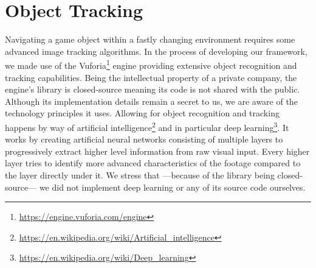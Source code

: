 \section{Object Tracking}
Navigating a game object within a fastly changing environment requires some advanced image tracking algorithms. In the process of developing our framework, we made use of the Vuforia\footnote{\protect\url{https://engine.vuforia.com/engine}} engine providing extensive object recognition and tracking capabilities. 
Being the intellectual property of a private company, the engine's library is closed-source meaning its code is not shared with the public. Although its implementation details remain a secret to us, we are aware of the technology principles it uses. Allowing for object recognition and tracking happens by way of artificial intelligence\footnote{\protect\url{https://en.wikipedia.org/wiki/Artificial_intelligence}} and in particular deep learning\footnote{\protect\url{https://en.wikipedia.org/wiki/Deep_learning}}. It works by creating artificial neural networks consisting of multiple layers to progressively extract higher level information from raw visual input. Every higher layer tries to identify more advanced characteristics of the footage compared to the layer directly under it. We stress that ---because of the library being closed-source--- we did not implement deep learning or any of its source code ourselves.





